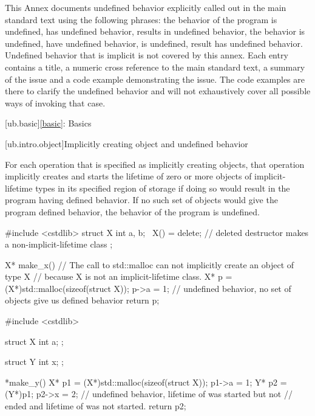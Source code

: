
This Annex documents undefined behavior explicitly called out in the main standard text using the
following phrases: the behavior of the program is undefined, has undefined behavior, results in
undefined behavior, the behavior is undefined, have undefined behavior, is undefined, result has
undefined behavior. Undefined behavior that is implicit is not covered by this annex. Each entry contains
a title, a numeric cross reference to the main standard text, a summary of the issue and a code example
demonstrating the issue. The code examples are there to clarify the undefined behavior and will not
exhaustively cover all possible ways of invoking that case.

[ub.basic]{\ref{basic}: Basics}

[ub.intro.object]{Implicitly creating object and undefined behavior}

\pnum
{}
For each
operation that is specified as implicitly creating objects, that operation implicitly creates and starts the
lifetime of zero or more objects of implicit-lifetime types  in its specified region of storage if doing so
would result in the program having defined behavior. If no such set of objects would give the program defined
behavior, the behavior of the program is undefined.

\pnum
\begin{example}
\begin{codeblock}
#include <cstdlib>
struct X {
  int a, b;
  ~X() = delete;        // deleted destructor makes  a non-implicit-lifetime class
};

X* make_x() {
        // The call to std::malloc can not implicitly create an object of type X
        // because X is not an implicit-lifetime class.
  X* p = (X*)std::malloc(sizeof(struct X));
  p->a = 1;     // undefined behavior, no set of objects give us defined behavior
  return p;
}
\end{codeblock}
\end{example}
\begin{example}
\begin{codeblock}
#include <cstdlib>

struct X {
  int a;
};

struct Y {
  int x;
};

*make_y() {
  X* p1 = (X*)std::malloc(sizeof(struct X));
  p1->a = 1;
  Y* p2 = (Y*)p1;
  p2->x = 2;    // undefined behavior, lifetime of  was started but not
                // ended and lifetime of  was not started.
  return p2;
}
\end{codeblock}
\end{example}

